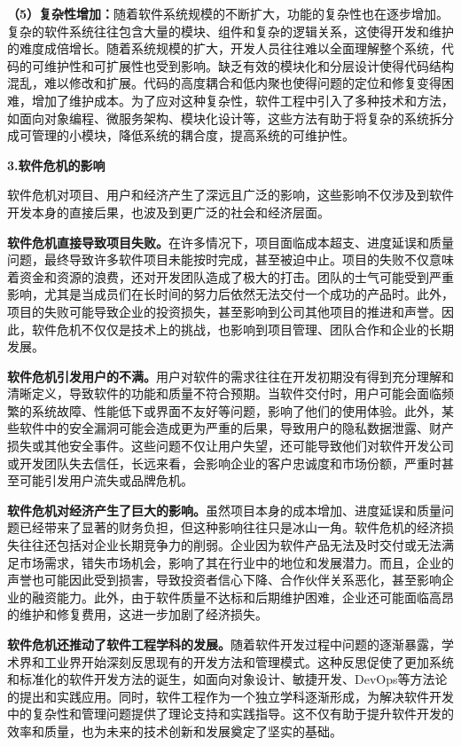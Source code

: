 \documentclass[12pt,a4paper]{ctexbook}
\begin{document}
\textbf{（5）复杂性增加：}随着软件系统规模的不断扩大，功能的复杂性也在逐步增加。复杂的软件系统往往包含大量的模块、组件和复杂的逻辑关系，这使得开发和维护的难度成倍增长。随着系统规模的扩大，开发人员往往难以全面理解整个系统，代码的可维护性和可扩展性也受到影响。缺乏有效的模块化和分层设计使得代码结构混乱，难以修改和扩展。代码的高度耦合和低内聚也使得问题的定位和修复变得困难，增加了维护成本。为了应对这种复杂性，软件工程中引入了多种技术和方法，如面向对象编程、微服务架构、模块化设计等，这些方法有助于将复杂的系统拆分成可管理的小模块，降低系统的耦合度，提高系统的可维护性。

\textbf{3.软件危机的影响}

软件危机对项目、用户和经济产生了深远且广泛的影响，这些影响不仅涉及到软件开发本身的直接后果，也波及到更广泛的社会和经济层面。

\textbf{软件危机直接导致项目失败。}在许多情况下，项目面临成本超支、进度延误和质量问题，最终导致许多软件项目未能按时完成，甚至被迫中止。项目的失败不仅意味着资金和资源的浪费，还对开发团队造成了极大的打击。团队的士气可能受到严重影响，尤其是当成员们在长时间的努力后依然无法交付一个成功的产品时。此外，项目的失败可能导致企业的投资损失，甚至影响到公司其他项目的推进和声誉。因此，软件危机不仅仅是技术上的挑战，也影响到项目管理、团队合作和企业的长期发展。

\textbf{软件危机引发用户的不满。}用户对软件的需求往往在开发初期没有得到充分理解和清晰定义，导致软件的功能和质量不符合预期。当软件交付时，用户可能会面临频繁的系统故障、性能低下或界面不友好等问题，影响了他们的使用体验。此外，某些软件中的安全漏洞可能会造成更为严重的后果，导致用户的隐私数据泄露、财产损失或其他安全事件。这些问题不仅让用户失望，还可能导致他们对软件开发公司或开发团队失去信任，长远来看，会影响企业的客户忠诚度和市场份额，严重时甚至可能引发用户流失或品牌危机。

\textbf{软件危机对经济产生了巨大的影响。}虽然项目本身的成本增加、进度延误和质量问题已经带来了显著的财务负担，但这种影响往往只是冰山一角。软件危机的经济损失往往还包括对企业长期竞争力的削弱。企业因为软件产品无法及时交付或无法满足市场需求，错失市场机会，影响了其在行业中的地位和发展潜力。而且，企业的声誉也可能因此受到损害，导致投资者信心下降、合作伙伴关系恶化，甚至影响企业的融资能力。此外，由于软件质量不达标和后期维护困难，企业还可能面临高昂的维护和修复费用，这进一步加剧了经济损失。

\textbf{软件危机还推动了软件工程学科的发展。}随着软件开发过程中问题的逐渐暴露，学术界和工业界开始深刻反思现有的开发方法和管理模式。这种反思促使了更加系统和标准化的软件开发方法的诞生，如面向对象设计、敏捷开发、DevOps等方法论的提出和实践应用。同时，软件工程作为一个独立学科逐渐形成，为解决软件开发中的复杂性和管理问题提供了理论支持和实践指导。这不仅有助于提升软件开发的效率和质量，也为未来的技术创新和发展奠定了坚实的基础。
\end{document}
